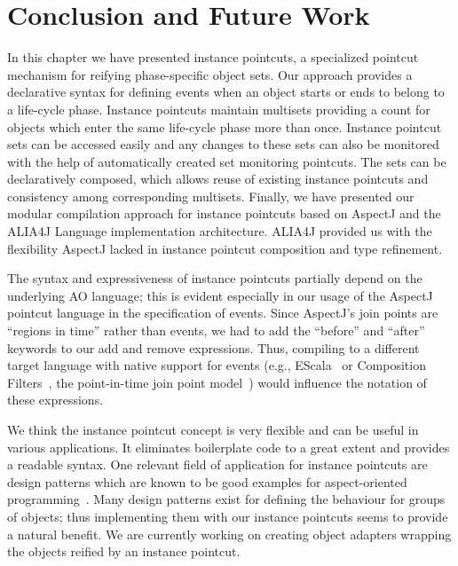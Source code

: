 \section{Conclusion and Future Work}
In this chapter we have presented instance pointcuts, a specialized pointcut mechanism for reifying phase-specific object sets. Our approach provides a declarative syntax for defining events when an object starts or ends to belong to a life-cycle phase. Instance pointcuts maintain multisets providing a count for objects which enter the same life-cycle phase more than once. Instance pointcut sets can be accessed easily and any changes to these sets can also be monitored with the help of automatically created set monitoring pointcuts. The sets can be declaratively composed, which allows reuse of existing instance pointcuts and consistency among corresponding multisets. Finally, we have presented our modular compilation approach for instance pointcuts based on AspectJ and the ALIA4J Language implementation architecture. ALIA4J provided us with the flexibility AspectJ lacked in instance pointcut composition and type refinement.

The syntax and expressiveness of instance pointcuts partially depend on the underlying AO language; this is evident especially in our usage of the AspectJ pointcut language in the specification of events. Since AspectJ's join points are ``regions in time'' rather than events, we had to add the ``before'' and ``after'' keywords to our add and remove expressions. Thus, compiling to a different target language with native support for events (e.g., EScala~\cite{Gasiunas2011} or Composition Filters~\cite{Bergmans2001b}, the point-in-time join point model~\cite{masuharafine}) would influence the notation of these expressions.

We think the instance pointcut concept is very flexible and can be useful in various applications. It eliminates boilerplate code to a great extent and provides a readable syntax. One relevant field of application for instance pointcuts are design patterns which are known to be good examples for aspect-oriented programming~\cite{hannemann:oopsla02}. Many design patterns exist for defining the behaviour for groups of objects; thus implementing them with our instance pointcuts seems to provide a natural benefit. We are currently working on creating object adapters wrapping the objects reified by an instance pointcut.




